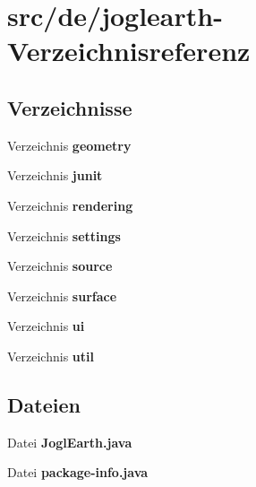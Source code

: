 \section{src/de/joglearth-\/\-Verzeichnisreferenz}
\label{dir_e96daa15a62890f0201772d72c5ce674}
\subsection*{Verzeichnisse}
\begin{DoxyCompactItemize}
\item 
Verzeichnis {\bf geometry}
\item 
Verzeichnis {\bf junit}
\item 
Verzeichnis {\bf rendering}
\item 
Verzeichnis {\bf settings}
\item 
Verzeichnis {\bf source}
\item 
Verzeichnis {\bf surface}
\item 
Verzeichnis {\bf ui}
\item 
Verzeichnis {\bf util}
\end{DoxyCompactItemize}
\subsection*{Dateien}
\begin{DoxyCompactItemize}
\item 
Datei {\bfseries Jogl\-Earth.\-java}
\item 
Datei {\bfseries package-\/info.\-java}
\end{DoxyCompactItemize}
